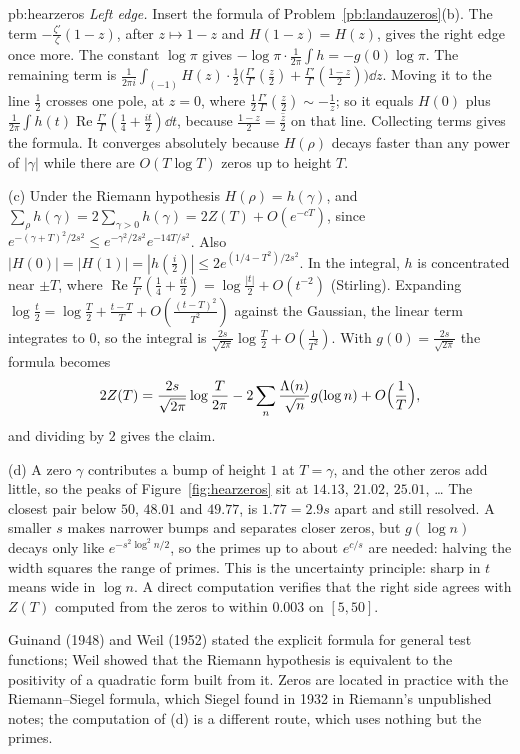 \begin{solution}{pb:hearzeros}
\emph{Left edge.} Insert the formula of Problem~\ref{pb:landauzeros}(b). The term $-\frac{\zeta'}\zeta(1-z)$, after $z\mapsto1-z$ and $H(1-z)=H(z)$, gives the right edge
once more. The constant $\log\pi$ gives $-\log\pi\cdot\frac1{2\pi}\int h=-g(0)\log\pi$. The remaining term is $\frac1{2\pi i}\int_{(-1)}H(z)\cdot\frac12\bigl(\frac{\Gamma'}\Gamma(\frac z2)+\frac{\Gamma'}\Gamma(\frac{1-z}2)\bigr)\dd z$.
Moving it to the line $\frac12$ crosses one pole, at $z=0$, where $\frac12\frac{\Gamma'}\Gamma(\frac z2)\sim-\frac1z$; so it equals $H(0)$ plus
$\frac1{2\pi}\int h(t)\operatorname{Re}\frac{\Gamma'}\Gamma(\frac14+\frac{it}2)\dd t$, because $\frac{1-z}2=\overline{\frac z2}$ on that line. Collecting terms gives the formula.
It converges absolutely because $H(\rho)$ decays faster than any power of $|\gamma|$ while there are $O(T\log T)$ zeros up to height $T$.

(c) Under the Riemann hypothesis $H(\rho)=h(\gamma)$, and $\sum_\rho h(\gamma)=2\sum_{\gamma>0}h(\gamma)=2Z(T)+O(e^{-cT})$, since $e^{-(\gamma+T)^2/2s^2}\le e^{-\gamma^2/2s^2}e^{-14T/s^2}$.
Also $|H(0)|=|H(1)|=|h(\frac i2)|\le2e^{(1/4-T^2)/2s^2}$. In the integral, $h$ is concentrated near $\pm T$, where
$\operatorname{Re}\frac{\Gamma'}\Gamma(\frac14+\frac{it}2)=\log\frac{|t|}2+O(t^{-2})$ (Stirling). Expanding $\log\frac t2=\log\frac T2+\frac{t-T}T+O(\frac{(t-T)^2}{T^2})$ against the Gaussian,
the linear term integrates to $0$, so the integral is $\frac{2s}{\sqrt{2\pi}}\log\frac T2+O(\frac1{T^2})$. With $g(0)=\frac{2s}{\sqrt{2\pi}}$ the formula becomes
\[
2Z(T)=\frac{2s}{\sqrt{2\pi}}\log\frac T{2\pi}-2\sum_n\frac{\Lambda(n)}{\sqrt n}g(\log n)+O\Bigl(\frac1T\Bigr),
\]
and dividing by $2$ gives the claim.

(d) A zero $\gamma$ contributes a bump of height $1$ at $T=\gamma$, and the other zeros add little, so the peaks of Figure~\ref{fig:hearzeros} sit at $14.13$, $21.02$, $25.01$, \dots{}
The closest pair below $50$, $48.01$ and $49.77$, is $1.77=2.9s$ apart and still resolved. A smaller $s$ makes narrower bumps and separates closer zeros, but $g(\log n)$ decays only
like $e^{-s^2\log^2n/2}$, so the primes up to about $e^{c/s}$ are needed: halving the width squares the range of primes. This is the uncertainty principle: sharp in $t$ means wide
in $\log n$. A direct computation verifies that the right side agrees with $Z(T)$ computed from the zeros to within $0.003$ on $[5,50]$.


\leads Guinand (1948) and Weil (1952) stated the explicit formula for general test functions; Weil showed that the Riemann hypothesis is equivalent to the positivity of a
quadratic form built from it. Zeros are located in practice with the Riemann--Siegel formula, which Siegel found in 1932 in Riemann's unpublished notes; the computation
of (d) is a different route, which uses nothing but the primes.
\end{solution}

